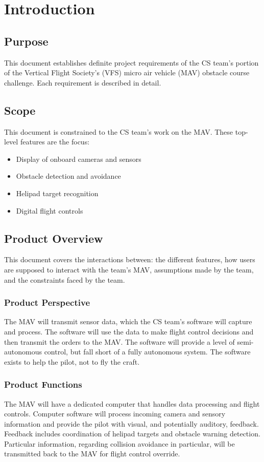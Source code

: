 \documentclass[onecolumn, oneside, letterpaper, draftclsnofoot, 10pt, compsoc]{IEEEtran}
\begin{document}
\section{Introduction}

\subsection{Purpose}
This document establishes definite project requirements of the CS team’s portion of the Vertical Flight Society’s (VFS) micro air vehicle (MAV) obstacle course challenge. Each requirement is described in detail.

\subsection{Scope}
This document is constrained to the CS team’s work on the MAV. These top-level features are the focus:
\begin{itemize}
    \item Display of onboard cameras and sensors
    \item Obstacle detection and avoidance
    \item Helipad target recognition
    \item Digital flight controls
\end{itemize}

\subsection{Product Overview}
This document covers the interactions between: the different features, how users are supposed to interact with the team’s MAV, assumptions made by the team, and the constraints faced by the team.

\subsubsection{Product Perspective}
The MAV will transmit sensor data, which the CS team’s software will capture and process. The software will use the data to make flight control decisions and then transmit the orders to the MAV. The software will provide a level of semi-autonomous control, but fall short of a fully autonomous system. The software exists to help the pilot, not to fly the craft.
\subsubsection{Product Functions}
The MAV will have a dedicated computer that handles data processing and flight controls. Computer software will process incoming camera and sensory information and provide the pilot with visual, and potentially auditory, feedback. Feedback includes coordination of helipad targets and obstacle warning detection. Particular information, regarding collision avoidance in particular, will be transmitted back to the MAV for flight control override.
\end{document}
